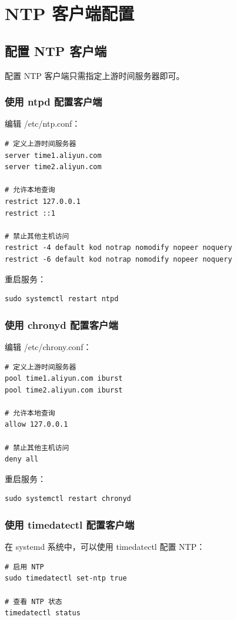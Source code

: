 \documentclass[12pt,UTF8]{ctexbook}
\begin{document}
\chapter{NTP 客户端配置}
\label{chap:ntp_client}

\section{配置 NTP 客户端}
\label{sec:configure_client}

配置 NTP 客户端只需指定上游时间服务器即可。

\subsection{使用 ntpd 配置客户端}

编辑 /etc/ntp.conf：
\begin{verbatim}
# 定义上游时间服务器
server time1.aliyun.com
server time2.aliyun.com

# 允许本地查询
restrict 127.0.0.1
restrict ::1

# 禁止其他主机访问
restrict -4 default kod notrap nomodify nopeer noquery
restrict -6 default kod notrap nomodify nopeer noquery
\end{verbatim}

重启服务：
\begin{verbatim}
sudo systemctl restart ntpd
\end{verbatim}

\subsection{使用 chronyd 配置客户端}

编辑 /etc/chrony.conf：
\begin{verbatim}
# 定义上游时间服务器
pool time1.aliyun.com iburst
pool time2.aliyun.com iburst

# 允许本地查询
allow 127.0.0.1

# 禁止其他主机访问
deny all
\end{verbatim}

重启服务：
\begin{verbatim}
sudo systemctl restart chronyd
\end{verbatim}

\subsection{使用 timedatectl 配置客户端}

在 systemd 系统中，可以使用 timedatectl 配置 NTP：
\begin{verbatim}
# 启用 NTP
sudo timedatectl set-ntp true

# 查看 NTP 状态
timedatectl status
\end{verbatim}
\end{document}
